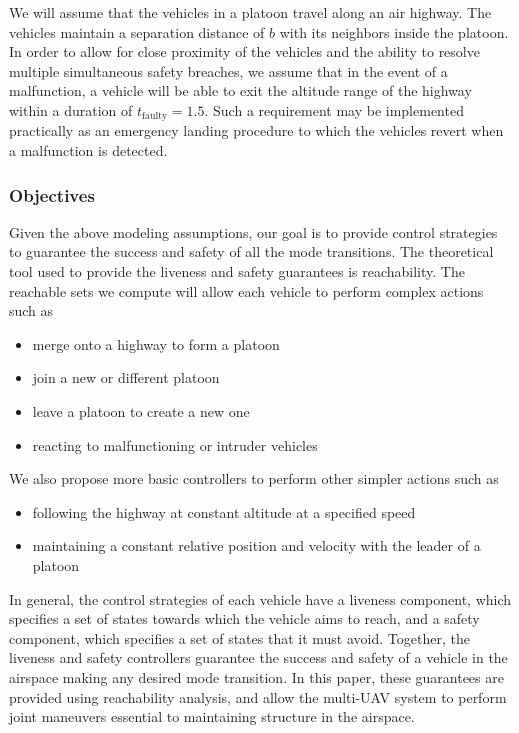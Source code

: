 We will assume that the vehicles in a platoon travel along an air highway. The vehicles maintain a separation distance of $b$ with its neighbors inside the platoon. In order to allow for close proximity of the vehicles and the ability to resolve multiple simultaneous safety breaches, we assume that in the event of a malfunction, a vehicle will be able to exit the altitude range of the highway within a duration of $t_\text{faulty}=1.5$. Such a requirement may be implemented practically as an emergency landing procedure to which the vehicles revert when a malfunction is detected.

\subsubsection{Objectives}
Given the above modeling assumptions, our goal is to provide control strategies to guarantee the success and safety of all the mode transitions. The theoretical tool used to provide the liveness and safety guarantees is reachability. The reachable sets we compute will allow each vehicle to perform complex actions such as 


\begin{itemize}
\item merge onto a highway to form a platoon
\item join a new or different platoon
\item leave a platoon to create a new one
\item reacting to malfunctioning or intruder vehicles
\end{itemize}

We also propose more basic controllers to perform other simpler actions such as
\begin{itemize}
\item following the highway at constant altitude at a specified speed
\item maintaining a constant relative position and velocity with the leader of a platoon
\end{itemize}

In general, the control strategies of each vehicle have a liveness component, which specifies a set of states towards which the vehicle aims to reach, and a safety component, which specifies a set of states that it must avoid. Together, the liveness and safety controllers guarantee the success and safety of a vehicle in the airspace making any desired mode transition. In this paper, these guarantees are provided using reachability analysis, and allow the multi-UAV system to perform joint maneuvers essential to maintaining structure in the airspace.
